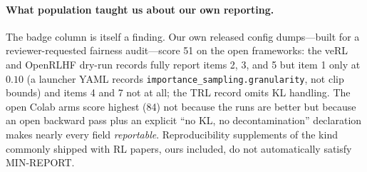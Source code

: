\paragraph{What population taught us about our own reporting.}
The badge column is itself a finding. Our own released config dumps---built for a
reviewer-requested fairness audit---score 51 on the open frameworks: the veRL
and OpenRLHF dry-run records fully report items 2, 3, and 5 but item 1 only at
$0.10$ (a launcher YAML records \texttt{importance_sampling.granularity}, not
clip bounds) and items 4 and 7 not at all; the TRL record omits KL handling.
The open Colab arms score highest (84) not because the runs are better but
because an open backward pass plus an explicit ``no KL, no decontamination''
declaration makes nearly every field \emph{reportable}. Reproducibility supplements of the kind commonly shipped
with RL papers, ours included, do not automatically satisfy MIN-REPORT.
